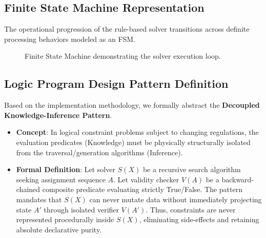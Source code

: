 \documentclass[conference]{IEEEtran}
\begin{document}
\subsection{Finite State Machine Representation}
The operational progression of the rule-based solver transitions across definite processing behaviors modeled as an FSM.
\begin{figure}[htbp]
\centering
{}
\caption{Finite State Machine demonstrating the solver execution loop.}
\label{fig:fsm}
\end{figure}

\subsection{Logic Program Design Pattern Definition}
Based on the implementation methodology, we formally abstract the \textbf{Decoupled Knowledge-Inference Pattern}.
\begin{itemize}
    \item \textbf{Concept}: In logical constraint problems subject to changing regulations, the evaluation predicates (Knowledge) must be physically structurally isolated from the traversal/generation algorithms (Inference).
    \item \textbf{Formal Definition}: Let solver $S(X)$ be a recursive search algorithm seeking assignment sequence $A$. Let validity checker $V(A)$ be a backward-chained composite predicate evaluating strictly True/False. The pattern mandates that $S(X)$ can never mutate data without immediately projecting state $A'$ through isolated verifier $V(A')$. Thus, constraints are never represented procedurally inside $S(X)$, eliminating side-effects and retaining absolute declarative purity.
\end{itemize}
\end{document}
